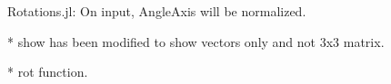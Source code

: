 
Rotations.jl: On input, AngleAxis will be normalized.

* show has been modified to show vectors  only and not 3x3 matrix.

* rot function.